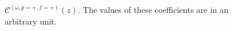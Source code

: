 \begin{figure}[H]
\begin{minipage}{.5\linewidth}
\centering
{}
\end{minipage}%
\begin{minipage}{.5\linewidth}
\centering
{}
\end{minipage}
\caption{$ \mathcal{C}^{(\omega,p=+,f=+)}(z) $. The values of these coefficients are in an arbitrary unit. }
\label{Cz}
\end{figure}




